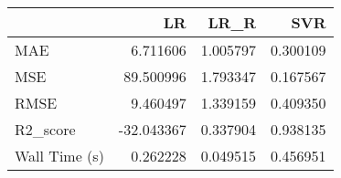 \begin{tabular}{lrrr}
\toprule
{} &         LR &      LR\_R &       SVR \\
\midrule
MAE           &   6.711606 &  1.005797 &  0.300109 \\
MSE           &  89.500996 &  1.793347 &  0.167567 \\
RMSE          &   9.460497 &  1.339159 &  0.409350 \\
 R2\_score     & -32.043367 &  0.337904 &  0.938135 \\
Wall Time (s) &   0.262228 &  0.049515 &  0.456951 \\
\bottomrule
\end{tabular}
